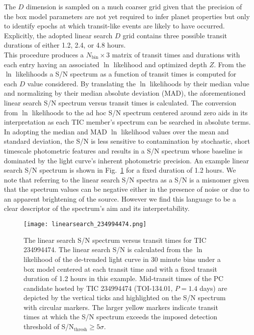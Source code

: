 The $D$ dimension is sampled on a much coarser grid
given that the precision of the box model parameters are not yet required to infer planet properties
but only to identify epochs at which transit-like events are likely to have occurred. Explicitly, the
adopted linear search $D$ grid contains three possible transit durations of either 1.2, 2.4, or 4.8 hours. \\



This procedure produces a $N_{\text{bin}} \times 3$ matrix of transit times and durations
with each entry having an associated $\ln$ likelihood and optimized depth $Z$.
From the $\ln$ likelihoods a S/N spectrum as a function of transit times
is computed for each $D$ value considered. By translating the $\ln$ likelihoods by
their median value and normalizing by their median absolute deviation (MAD),
the aforementioned linear search S/N spectrum versus transit times is calculated.
The conversion from
$\ln$ likelihoods to the ad hoc S/N spectrum centered around zero aids in its interpretation as
each TIC member's spectrum can be searched in absolute terms.
In adopting the median and MAD $\ln$ likelihood values over the mean and standard deviation, the S/N
is less sensitive to contamination by stochastic, short timescale photometric features
and results in a S/N spectrum whose baseline  is dominated by the light curve's
inherent photometric precision. An example linear search S/N spectrum is shown in
Fig.~\ref{fig:linearsearch} for a fixed duration of 1.2 hours. We note that referring to the
linear search S/N spectra as a S/N is a misnomer given that the spectrum values can be negative
either in the presence of noise or due to an apparent brightening of the source.
However we find this language to be a clear descriptor of the spectrum's aim and its
interpretability. \\

\begin{figure}
  \centering
  \texttt{[image: linearsearch\_234994474.png]}
  \caption{The linear search S/N spectrum versus transit times for TIC 234994474.
    The linear search S/N is calculated from the $\ln$ likelihood of the de-trended light
    curve in 30 minute bins under a box model centered at each transit time and with a fixed
    transit duration of 1.2 hours in this example. Mid-transit times of the PC candidate
    hosted by TIC 234994474 (TOI-134.01, $P=1.4$ days) are depicted by the vertical ticks
    and highlighted on the S/N spectrum with circular markers. The larger yellow markers
    indicate transit times at which the S/N spectrum exceeds the imposed \pipeline{}
    detection threshold of S/N$_{\text{thresh}}\geq 5\sigma$.}
  \label{fig:linearsearch}
\end{figure}

